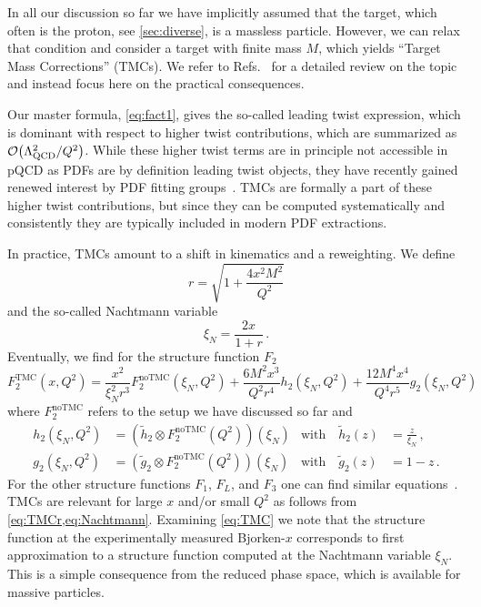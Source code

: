 In all our discussion so far we have implicitly assumed that the target, which often is the proton, see \cref{sec:diverse}, is a massless particle.
However, we can relax that condition and consider a target with finite mass $M$, which yields \enquote{Target Mass Corrections} (TMCs).
We refer to Refs.~\cite{Schienbein:2007gr,Ruiz:2023ozv} for a detailed review on the topic and instead focus here on the practical consequences.

Our master formula, \cref{eq:fact1}, gives the so-called leading twist expression, which is dominant with respect to higher twist contributions, which are summarized as $\order{\LQCD^2/Q^2}$.
While these higher twist terms are in principle not accessible in pQCD as PDFs are by definition leading twist objects, they have recently gained renewed interest by PDF fitting groups~\cite{Cerutti:2025yji,Ball:2025xtj,Harland-Lang:2025wvm}.
TMCs are formally a part of these higher twist contributions, but since they can be computed systematically and consistently they are typically included in modern PDF extractions.

In practice, TMCs amount to a shift in kinematics and a reweighting.
We define
\begin{equation}
    r = \sqrt{1 + \frac{4x^2 M^2}{Q^2}} \label{eq:TMCr}
\end{equation}
and the so-called Nachtmann variable~\cite{Nachtmann:1973mr}
\begin{equation}
    \xi_N = \frac{2x}{1 + r}\,. \label{eq:Nachtmann}
\end{equation}
Eventually, we find for the structure function $F_2$
\begin{equation}
    F_2^\text{TMC}(x,Q^2) = \frac{x^2}{\xi_N^2 r^3} F_2^\text{noTMC}(\xi_N, Q^2) + \frac{6M^2 x^3}{Q^2 r^4}h_2(\xi_N,Q^2) + \frac{12M^4 x^4}{Q^4 r^5}g_2(\xi_N,Q^2) \label{eq:TMC}
\end{equation}
where $F_2^\text{noTMC}$ refers to the setup we have discussed so far and
\begin{align}
    h_2(\xi_N,Q^2) &= \left(\tilde h_2 \otimes F_2^\text{noTMC}(Q^2)\right)(\xi_N) &\text{with}\quad \tilde h_2(z) &= \frac z {\xi_N}\,, \label{eq:TMCh2}\\
    g_2(\xi_N,Q^2) &= \left(\tilde g_2 \otimes F_2^\text{noTMC}(Q^2)\right)(\xi_N) &\text{with}\quad \tilde g_2(z) &= 1 - z\,. \label{eq:TMCg2}
\end{align}
For the other structure functions $F_1$, $F_L$, and $F_3$ one can find similar equations~\cite{Schienbein:2007gr}.
TMCs are relevant for large $x$ and/or small $Q^2$ as follows from \cref{eq:TMCr,eq:Nachtmann}.
Examining \cref{eq:TMC} we note that the structure function at the experimentally measured Bjorken-$x$ corresponds to first approximation to a structure function computed at the Nachtmann variable $\xi_N$.
This is a simple consequence from the reduced phase space, which is available for massive particles.

